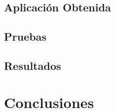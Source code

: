 \documentclass{iccmemoria}
\begin{document}
	\section{Aplicación Obtenida}
	


	\section{Pruebas}
	

	\section{Resultados}
	

\chapter{Conclusiones}



	












%

%

%
\end{document}

